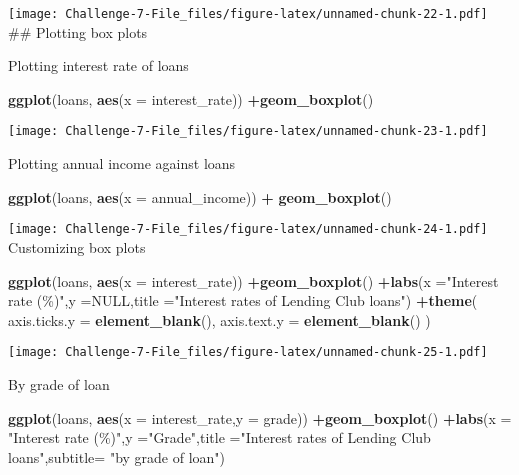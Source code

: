 \documentclass[
]{article}
\newenvironment{Shaded}{\begin{snugshade}}{\end{snugshade}}
\newcommand{\AttributeTok}[1]{\textcolor[rgb]{0.13,0.29,0.53}{#1}}
\newcommand{\ConstantTok}[1]{\textcolor[rgb]{0.56,0.35,0.01}{#1}}
\newcommand{\FunctionTok}[1]{\textcolor[rgb]{0.13,0.29,0.53}{\textbf{#1}}}
\newcommand{\NormalTok}[1]{#1}
\newcommand{\SpecialCharTok}[1]{\textcolor[rgb]{0.81,0.36,0.00}{\textbf{#1}}}
\newcommand{\StringTok}[1]{\textcolor[rgb]{0.31,0.60,0.02}{#1}}
\begin{document}
\texttt{[image: Challenge-7-File\_files/figure-latex/unnamed-chunk-22-1.pdf]}
\#\# Plotting box plots

Plotting interest rate of loans

\begin{Shaded}
\begin{Highlighting}[]
\FunctionTok{ggplot}\NormalTok{(loans, }\FunctionTok{aes}\NormalTok{(}\AttributeTok{x =}\NormalTok{ interest\_rate)) }\SpecialCharTok{+}\FunctionTok{geom\_boxplot}\NormalTok{()}
\end{Highlighting}
\end{Shaded}

\texttt{[image: Challenge-7-File\_files/figure-latex/unnamed-chunk-23-1.pdf]}

Plotting annual income against loans

\begin{Shaded}
\begin{Highlighting}[]
\FunctionTok{ggplot}\NormalTok{(loans, }\FunctionTok{aes}\NormalTok{(}\AttributeTok{x =}\NormalTok{ annual\_income)) }\SpecialCharTok{+}
\FunctionTok{geom\_boxplot}\NormalTok{()}
\end{Highlighting}
\end{Shaded}

\texttt{[image: Challenge-7-File\_files/figure-latex/unnamed-chunk-24-1.pdf]}
Customizing box plots

\begin{Shaded}
\begin{Highlighting}[]
\FunctionTok{ggplot}\NormalTok{(loans, }\FunctionTok{aes}\NormalTok{(}\AttributeTok{x =}\NormalTok{ interest\_rate)) }\SpecialCharTok{+}\FunctionTok{geom\_boxplot}\NormalTok{() }\SpecialCharTok{+}\FunctionTok{labs}\NormalTok{(}\AttributeTok{x =}\StringTok{"Interest rate (\%)"}\NormalTok{,}\AttributeTok{y =}\ConstantTok{NULL}\NormalTok{,}\AttributeTok{title =}\StringTok{"Interest rates of Lending Club loans"}\NormalTok{) }\SpecialCharTok{+}\FunctionTok{theme}\NormalTok{( }\AttributeTok{axis.ticks.y =} \FunctionTok{element\_blank}\NormalTok{(), }\AttributeTok{axis.text.y =} \FunctionTok{element\_blank}\NormalTok{() )}
\end{Highlighting}
\end{Shaded}

\texttt{[image: Challenge-7-File\_files/figure-latex/unnamed-chunk-25-1.pdf]}

By grade of loan

\begin{Shaded}
\begin{Highlighting}[]
\FunctionTok{ggplot}\NormalTok{(loans, }\FunctionTok{aes}\NormalTok{(}\AttributeTok{x =}\NormalTok{ interest\_rate,}\AttributeTok{y =}\NormalTok{ grade)) }\SpecialCharTok{+}\FunctionTok{geom\_boxplot}\NormalTok{() }\SpecialCharTok{+}\FunctionTok{labs}\NormalTok{(}\AttributeTok{x =}
\StringTok{"Interest rate (\%)"}\NormalTok{,}\AttributeTok{y =}\StringTok{"Grade"}\NormalTok{,}\AttributeTok{title =}\StringTok{"Interest rates of Lending Club loans"}\NormalTok{,}\AttributeTok{subtitle=} \StringTok{"by grade of loan"}\NormalTok{)}
\end{Highlighting}
\end{Shaded}
\end{document}
